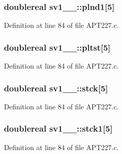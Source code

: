 \subsubsection[{\texorpdfstring{plnd1}{plnd1}}]{\setlength{\rightskip}{0pt plus 5cm}doublereal sv1\+\_\+\_\+\+::plnd1\mbox{[}5\mbox{]}}\hypertarget{structsv1__1___ab7fb40d740c50594ae1c873101910edc}{}\label{structsv1__1___ab7fb40d740c50594ae1c873101910edc}


Definition at line 84 of file A\+P\+T227.\+c.

\subsubsection[{\texorpdfstring{pltst}{pltst}}]{\setlength{\rightskip}{0pt plus 5cm}doublereal sv1\+\_\+\_\+\+::pltst\mbox{[}5\mbox{]}}\hypertarget{structsv1__1___a9c7976d1c56440d7e41a53e8b6661f09}{}\label{structsv1__1___a9c7976d1c56440d7e41a53e8b6661f09}


Definition at line 84 of file A\+P\+T227.\+c.

\subsubsection[{\texorpdfstring{stck}{stck}}]{\setlength{\rightskip}{0pt plus 5cm}doublereal sv1\+\_\+\_\+\+::stck\mbox{[}5\mbox{]}}\hypertarget{structsv1__1___a64ba4dad196327837e4966ef1320d033}{}\label{structsv1__1___a64ba4dad196327837e4966ef1320d033}


Definition at line 84 of file A\+P\+T227.\+c.

\subsubsection[{\texorpdfstring{stck1}{stck1}}]{\setlength{\rightskip}{0pt plus 5cm}doublereal sv1\+\_\+\_\+\+::stck1\mbox{[}5\mbox{]}}\hypertarget{structsv1__1___a028c473e10246e1ce17ab84ac9ac21ff}{}\label{structsv1__1___a028c473e10246e1ce17ab84ac9ac21ff}


Definition at line 84 of file A\+P\+T227.\+c.

